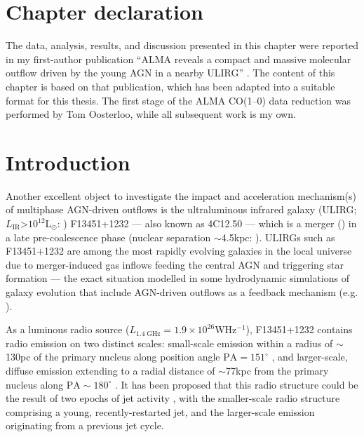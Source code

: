 \section*{Chapter declaration}
The data, analysis, results, and discussion presented in this chapter were reported in my first-author publication ``ALMA reveals a compact and massive molecular outflow driven by the young AGN in a nearby ULIRG'' \citep{Holden2024}. The content of this chapter is based on that publication, which has been adapted into a suitable format for this thesis. The first stage of the ALMA CO(1--0) data reduction was performed by Tom Oosterloo, while all subsequent work is my own.

\newpage

\section{Introduction}
\label{section: alma_f13451_1232: introduction}

Another excellent object to investigate the impact and acceleration mechanism(s) of multiphase AGN-driven outflows is the ultraluminous infrared galaxy (ULIRG; $L_\mathrm{IR}$\;\textgreater\;$10^{12}$\;L$_\mathrm{\odot}$: \citealt{Sanders1996}) F13451+1232 --- also known as 4C12.50 --- which is a merger (\citealt{Gilmore1986, Heckman1986}) in a late pre-coalescence phase (nuclear separation $\sim$4.5\;kpc: \citealt{Tadhunter2018}). ULIRGs such as F13451+1232 are among the most rapidly evolving galaxies in the local universe due to merger-induced gas inflows feeding the central AGN and triggering star formation --- the exact situation modelled in some hydrodynamic simulations of galaxy evolution that include AGN-driven outflows as a feedback mechanism (e.g. \citealt{DiMatteo2005, Hopkins2008}). 

As a luminous radio source ($L_\mathrm{1.4\;GHz} = 1.9\times10^{26}$\;W\;Hz$^{-1}$), F13451+1232 contains radio emission on two distinct scales: small-scale emission within a radius of $\sim$130\;pc of the primary nucleus along position angle $\mathrm{PA}=151^\circ$ \citep{Stanghellini1997, Lister2003, Morganti2013_4c1250}, and larger-scale, diffuse emission extending to a radial distance of $\sim$77\;kpc from the primary nucleus along $\mathrm{PA}\sim180^\circ$ \citep{Stanghellini2005}. It has been proposed that this radio structure could be the result of two epochs of jet activity \citep{Stanghellini2005}, with the smaller-scale radio structure comprising a young, recently-restarted jet, and the larger-scale emission originating from a previous jet cycle. 

